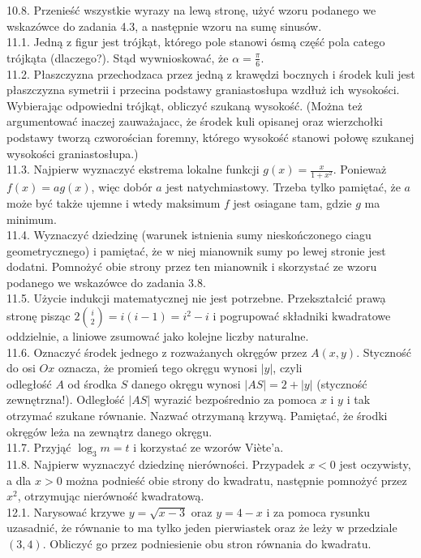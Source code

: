 \documentclass[10pt]{article}
\begin{document}
10.8. Przenieść wszystkie wyrazy na lewą stronę, użyć wzoru podanego we wskazówce do zadania 4.3, a następnie wzoru na sumę sinusów.\\
11.1. Jedną z figur jest trójkạt, którego pole stanowi ósmą część pola catego trójkąta (dlaczego?). Stąd wywnioskować, że $\alpha=\frac{\pi}{6}$.\\
11.2. Płaszczyzna przechodzaca przez jedną z krawędzi bocznych i środek kuli jest płaszczyzna symetrii i przecina podstawy graniastosłupa wzdłuż ich wysokości. Wybierając odpowiedni trójkąt, obliczyć szukaną wysokość. (Można też argumentować inaczej zauważajacc, że środek kuli opisanej oraz wierzchołki podstawy tworzą czworościan foremny, którego wysokość stanowi połowę szukanej wysokości graniastosłupa.)\\
11.3. Najpierw wyznaczyć ekstrema lokalne funkcji $g(x)=\frac{x}{1+x^{2}}$. Ponieważ $f(x)=a g(x)$, więc dobór $a$ jest natychmiastowy. Trzeba tylko pamiętać, że $a$ może być także ujemne i wtedy maksimum $f$ jest osiagane tam, gdzie $g$ ma minimum.\\
11.4. Wyznaczyć dziedzinę (warunek istnienia sumy nieskończonego ciagu geometrycznego) i pamiętać, że w niej mianownik sumy po lewej stronie jest dodatni. Pomnożyć obie strony przez ten mianownik i skorzystać ze wzoru podanego we wskazówce do zadania 3.8.\\
11.5. Użycie indukcji matematycznej nie jest potrzebne. Przekształcić prawạ stronę pisząc $2\binom{i}{2}=i(i-1)=i^{2}-i$ i pogrupować składniki kwadratowe oddzielnie, a liniowe zsumować jako kolejne liczby naturalne.\\
11.6. Oznaczyć środek jednego z rozważanych okręgów przez $A(x, y)$. Styczność do osi $O x$ oznacza, że promień tego okręgu wynosi $|y|$, czyli\\
odległość $A$ od środka $S$ danego okręgu wynosi $|A S|=2+|y|$ (styczność zewnętrzna!). Odległość $|A S|$ wyrazić bezpośrednio za pomoca $x$ i $y$ i tak otrzymać szukane równanie. Nazwać otrzymaną krzywą. Pamiętać, że środki okręgów leża na zewnątrz danego okręgu.\\
11.7. Przyjąć $\log _{3} m=t$ i korzystać ze wzorów Viète'a.\\
11.8. Najpierw wyznaczyć dziedzinę nierówności. Przypadek $x<0$ jest oczywisty, a dla $x>0$ można podnieść obie strony do kwadratu, następnie pomnożyć przez $x^{2}$, otrzymując nierówność kwadratową.\\
12.1. Narysować krzywe $y=\sqrt{x-3}$ oraz $y=4-x$ i za pomoca rysunku uzasadnić, że równanie to ma tylko jeden pierwiastek oraz że leży w przedziale $(3,4)$. Obliczyć go przez podniesienie obu stron równania do kwadratu.\\
\end{document}
